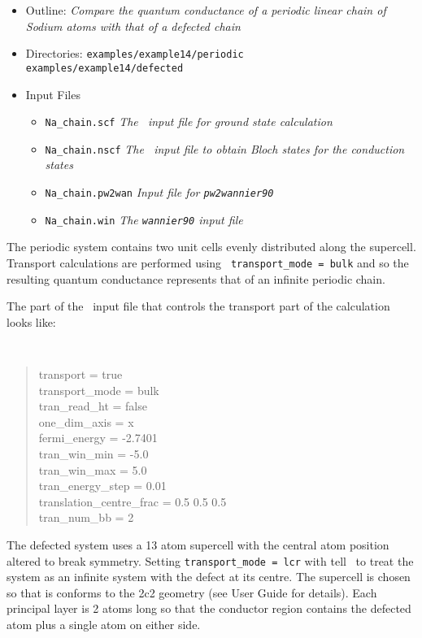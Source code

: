 \documentclass[a4paper,11pt,twoside]{article}
\begin{document}
\begin{itemize}
  \item{Outline: \it{Compare the quantum conductance of a periodic 
  	linear chain of Sodium atoms with that of a defected chain}}
  \item{\begin{tabbing}
  Directories: \= {\tt examples/example14/periodic}\\ 
    				 \> {\tt examples/example14/defected}
    		\end{tabbing}}
  \item{Input Files}
    \begin{itemize}
      \item{ {\tt Na\_chain.scf}  {\it The \pwscf\ input file for ground state
	  calculation}}
      \item{ {\tt Na\_chain.nscf}  {\it The \pwscf\ input file to obtain Bloch
	  states for the conduction states}} 
      \item{ {\tt Na\_chain.pw2wan}  {\it Input file for {\tt pw2wannier90}}}
      \item{ {\tt Na\_chain.win}  {\it The {\tt wannier90} input file}}
    \end{itemize}
\end{itemize}

The periodic system contains two unit cells evenly distributed along
the supercell. Transport calculations are performed using {\tt
  transport\_mode = bulk} and so the resulting quantum conductance
represents that of an infinite periodic chain.

The part of the \wannier\ input file that controls the transport part
of the calculation looks like:

{\tt
\begin{quote}
transport = true\\
transport\_mode = bulk\\
tran\_read\_ht = false\\
one\_dim\_axis = x\\
fermi\_energy = -2.7401\\
tran\_win\_min = -5.0\\
tran\_win\_max = 5.0\\
tran\_energy\_step = 0.01\\
translation\_centre\_frac = 0.5 0.5 0.5\\
tran\_num\_bb = 2

\end{quote} }

The defected system uses a 13 atom supercell with the central atom
position altered to break symmetry. Setting {\tt transport\_mode = lcr} with tell 
\wannier\ to treat the system as an infinite system with the defect at its centre.
The supercell is chosen so that is conforms to the 2c2 geometry (see User Guide 
for details). Each principal layer is 2 atoms long so that the conductor 
region contains the defected atom plus a single atom on either side.
\end{document}
